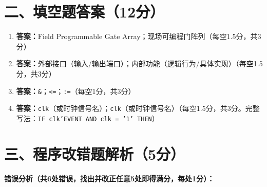 \section{二、填空题答案（12分）}

\begin{enumerate}[label=\arabic*., leftmargin=*]

\item \textbf{答案：}Field Programmable Gate Array；现场可编程门阵列（每空1.5分，共3分）

\item \textbf{答案：}外部接口（输入/输出端口）；内部功能（逻辑行为/具体实现）（每空1.5分，共3分）

\item \textbf{答案：}\verb|&|；\verb|<=|；\verb|:=|（每空1分，共3分）

\item \textbf{答案：}\verb|clk|（或时钟信号名）；\verb|clk|（或时钟信号名）（每空1.5分，共3分。完整写法：\texttt{IF clk'EVENT AND clk = '1' THEN}）

\end{enumerate}

\section{三、程序改错题解析（5分）}

\textbf{错误分析（共6处错误，找出并改正任意5处即得满分，每处1分）：}

